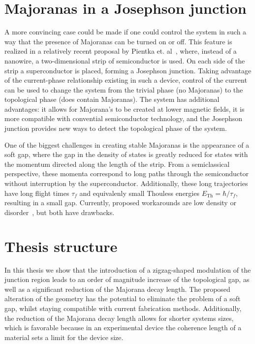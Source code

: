 \section{Majoranas in a Josephson junction}
	A more convincing case could be made if one could control the system in such a way that the presence of Majoranas can be turned on or off.
	This feature is realized in a relatively recent proposal by Pientka et. al~\cite{pientka_topological_2017}, where, instead of a nanowire, a two-dimensional strip of semiconductor is used.
	On each side of the strip a superconductor is placed, forming a Josephson junction.
	Taking advantage of the current-phase relationship existing in such a device, control of the current can be used to change the system from the trivial phase (no Majoranas) to the topological phase (does contain Majoranas).
	The system has additional advantages: it allows for Majorana's to be created at lower magnetic fields, it is more compatible with convential semiconductor technology, and the Josephson junction provides new ways to detect the topological phase of the system.

	One of the biggest challenges in creating stable Majoranas is the appearance of a soft gap, where the gap in the density of states is greatly reduced for states with the momentum directed along the length of the strip.
	From a semiclassical perspective, these momenta correspond to long paths through the semiconductor without interruption by the superconductor.
	Additionally, these long trajectories have long flight times $\tau_f$ and equivalenly small Thouless energies $E_{\textrm{Th}}=\hbar / \tau_f$, resulting in a small gap. 
	Currently, proposed workarounds are low density or disorder~\cite{haim_double-edge_2018}, but both have drawbacks.

\section{Thesis structure}
	In this thesis we show that the introduction of a zigzag-shaped modulation of the junction region leads to an order of magnitude increase of the topological gap, as well as a significant reduction of the Majorana decay length.
	The proposed alteration of the geometry has the potential to eliminate the problem of a soft gap, whilst staying compatible with current fabrication methods.
	Additionally, the reduction of the Majorana decay length allows for shorter systems sizes, which is favorable because in an experimental device the coherence length of a material sets a limit for the device size.
	

